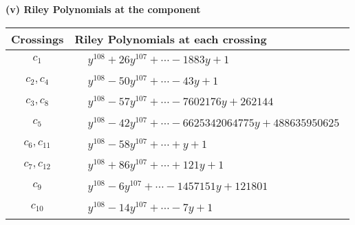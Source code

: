 \documentclass[1p]{elsarticle_modified}
\theoremstyle{definition}
\begin{document}
\newpage\renewcommand{\arraystretch}{1}
\flushleft \textbf{(v) Riley Polynomials at the component}\newline \\
\begin{tabular}{m{50pt}|m{274pt}}
Crossings & \hspace{64pt}Riley Polynomials at each crossing \\
\hline $$\begin{aligned}c_{1}\end{aligned}$$&$\begin{aligned}
&y^{108}+26 y^{107}+\cdots-1883 y+1
\end{aligned}$\\
\hline $$\begin{aligned}c_{2},c_{4}\end{aligned}$$&$\begin{aligned}
&y^{108}-50 y^{107}+\cdots-43 y+1
\end{aligned}$\\
\hline $$\begin{aligned}c_{3},c_{8}\end{aligned}$$&$\begin{aligned}
&y^{108}-57 y^{107}+\cdots-7602176 y+262144
\end{aligned}$\\
\hline $$\begin{aligned}c_{5}\end{aligned}$$&$\begin{aligned}
&y^{108}-42 y^{107}+\cdots-6625342064775 y+488635950625
\end{aligned}$\\
\hline $$\begin{aligned}c_{6},c_{11}\end{aligned}$$&$\begin{aligned}
&y^{108}-58 y^{107}+\cdots+y+1
\end{aligned}$\\
\hline $$\begin{aligned}c_{7},c_{12}\end{aligned}$$&$\begin{aligned}
&y^{108}+86 y^{107}+\cdots+121 y+1
\end{aligned}$\\
\hline $$\begin{aligned}c_{9}\end{aligned}$$&$\begin{aligned}
&y^{108}-6 y^{107}+\cdots-1457151 y+121801
\end{aligned}$\\
\hline $$\begin{aligned}c_{10}\end{aligned}$$&$\begin{aligned}
&y^{108}-14 y^{107}+\cdots-7 y+1
\end{aligned}$\\
\hline
\end{tabular}\\~\\
\end{document}

